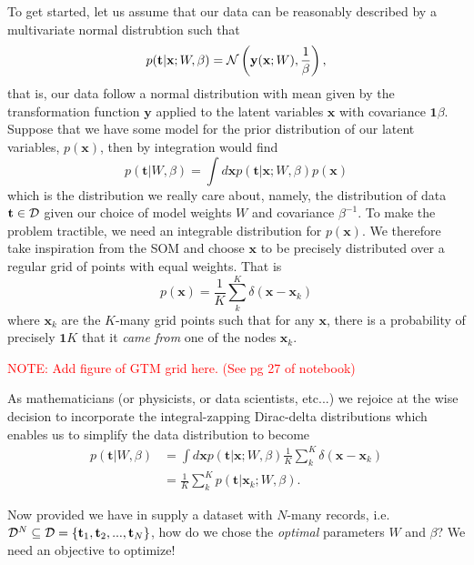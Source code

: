 To get started, let us assume that our data can be reasonably described by a multivariate normal distrubtion such that
\begin{equation}
  p(\mathbf{t} \vert \mathbf{x}; W, \beta) = \mathcal{N}\left(\mathbf{y}(\mathbf{x};W), \frac{1}{\beta}\right),
\end{equation}
that is, our data follow a normal distribution with mean given by the transformation function $\mathbf{y}$ applied to the latent variables $\mathbf{x}$ with covariance $\mathbf{1}{\beta}$. Suppose that we have some model for the prior distribution of our latent variables, $p(\mathbf{x})$, then by integration would find
\begin{equation}
  p(\mathbf{t}\vert W, \beta) = \int d\mathbf{x} p(\mathbf{t}\vert \mathbf{x};W,\beta) p(\mathbf{x})
\end{equation}
which is the distribution we really care about, namely, the distribution of data $\mathbf{t}\in\mathcal{D}$ given our choice of model weights $W$ and covariance $\beta^{-1}$. To make the problem tractible, we need an integrable distribution for $p(\mathbf{x})$. We therefore take inspiration from the SOM and choose $\mathbf{x}$ to be precisely distributed over a regular grid of points with equal weights. That is
\begin{equation}
  p(\mathbf{x}) = \frac{1}{K}\sum_k^K\delta(\mathbf{x}-\mathbf{x}_k)
\end{equation}
where $\mathbf{x}_k$ are the $K$-many grid points such that for any $\mathbf{x}$, there is a probability of precisely $\mathbf{1}{K}$ that it \textit{came from} one of the nodes $\mathbf{x}_k$.

\textcolor{red}{NOTE: Add figure of GTM grid here. (See pg 27 of notebook)}

As mathematicians (or physicists, or data scientists, etc...) we rejoice at the wise decision to incorporate the integral-zapping Dirac-delta distributions which enables us to simplify the data distribution to become
\begin{equation}
  \begin{aligned}
    p(\mathbf{t}\vert W, \beta) &= \int d\mathbf{x} p(\mathbf{t}\vert\mathbf{x};W,\beta)\frac{1}{K}\sum_k^K\delta(\mathbf{x}-\mathbf{x}_k) \\
    &= \frac{1}{K}\sum_k^Kp(\mathbf{t}\vert\mathbf{x}_k;W,\beta).
  \end{aligned}
\end{equation}

Now provided we have in supply a dataset with $N$-many records, i.e. $\mathcal{D}^N\subseteq\mathcal{D} =\{\mathbf{t}_1,\mathbf{t}_2,...,\mathbf{t}_N \}$, how do we chose the \textit{optimal} parameters $W$ and $\beta$? We need an objective to optimize!

